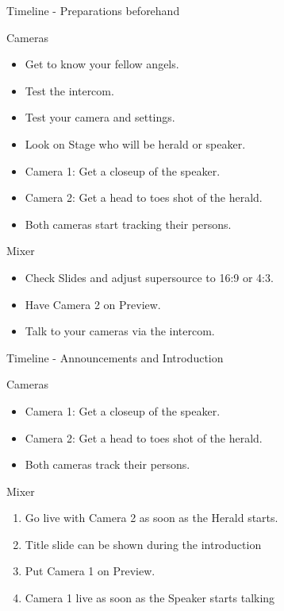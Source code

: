 \documentclass[aspectratio=169]{beamer}
\begin{document}
\begin{frame}{Timeline - Preparations beforehand}
	\begin{block}{Cameras}
		\begin{itemize}
			\item Get to know your fellow angels.
			\item Test the intercom.
			\item Test your camera and settings.
			\item Look on Stage who will be herald or speaker.
			\item Camera 1: Get a closeup of the speaker.
			\item Camera 2: Get a head to toes shot of the herald.
			\item Both cameras start tracking their persons.
		\end{itemize}
	\end{block}
	\begin{block}{Mixer}
		\begin{itemize}
			\item Check Slides and adjust supersource to 16:9 or 4:3.
			\item Have Camera 2 on Preview.
			\item Talk to your cameras via the intercom.
		\end{itemize}
	\end{block}
\end{frame}

\begin{frame}{Timeline - Announcements and Introduction}
	\begin{block}{Cameras}
		\begin{itemize}
			\item Camera 1: Get a closeup of the speaker.
			\item Camera 2: Get a head to toes shot of the herald.
			\item Both cameras track their persons.
		\end{itemize}
	\end{block}
	
	\begin{block}{Mixer}
		\begin{enumerate}
			\item Go live with Camera 2 as soon as the Herald starts.
			\item Title slide can be shown during the introduction 
			\item Put Camera 1 on Preview.
			\item Camera 1 live as soon as the Speaker starts talking
		\end{enumerate}
	\end{block}
\end{frame}
\end{document}
